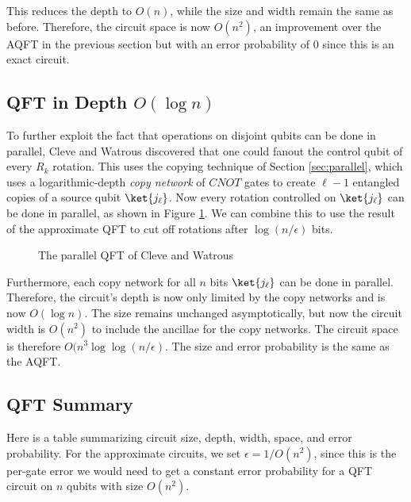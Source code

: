 This reduces the depth to $O(n)$, while the size and width remain the same
as before. Therefore, the circuit space is now $O(n^2)$, an improvement over
the AQFT in the previous section but with an error probability of $0$ since
this is an exact circuit.

\subsection{QFT in Depth $O(\log n)$}

To further exploit the fact that operations on disjoint qubits can be done
in parallel, Cleve and Watrous discovered that one could fanout the control
qubit of every $R_k$ rotation. This uses the copying technique of
Section \ref{sec:parallel}, which uses a logarithmic-depth \emph{copy network}
of
$CNOT$ gates to create $\ell-1$ entangled copies of a source qubit
$\ket{j_\ell}$. Now every rotation controlled on $\ket{j_\ell}$ can be done
in parallel, as shown in Figure \ref{fig:qft-cw}. We can combine
this to use the
result of the approximate QFT to cut off rotations after $\log(n/\epsilon)$
bits.

\begin{figure}
\label{fig:qft-cw}
\caption{The parallel QFT of Cleve and Watrous}
\end{figure}

Furthermore, each copy network for all $n$ bits $\ket{j_\ell}$ can be done
in parallel.
Therefore, the circuit's depth is now only limited by the copy networks
and is now $O(\log n)$. The size remains unchanged asymptotically, but now
the circuit width is $O(n^2)$ to include the ancillae for the copy networks.
The circuit space is therefore $O(n^3\log\log(n/\epsilon)$. The size and
error probability is
the same as the AQFT.

\subsection{QFT Summary}

Here is a table summarizing circuit size, depth, width, space, and
error probability. For the approximate circuits, we set $\epsilon = 1/O(n^2)$,
since this is the per-gate error we would need to get a constant
error probability for a QFT circuit on $n$ qubits with size $O(n^2)$.

